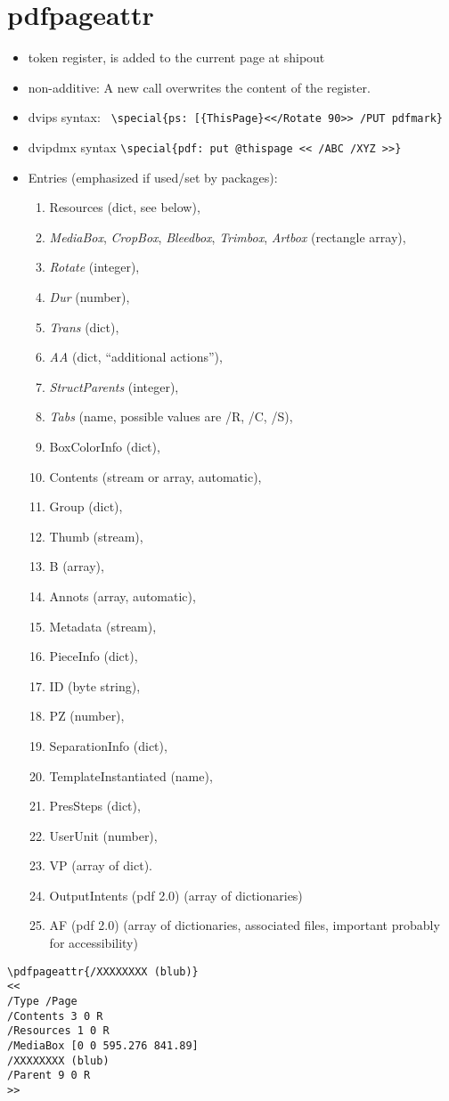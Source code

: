\documentclass{article}
\begin{document}
\section{pdfpageattr}
\begin{itemize}
\item token register, is added to the current page at shipout
\item non-additive: A new call overwrites the content of the register.
\item dvips syntax:
\verb+ \special{ps: [{ThisPage}<</Rotate 90>> /PUT pdfmark}+
\item dvipdmx syntax \verb+\special{pdf: put @thispage << /ABC /XYZ >>}+
\item Entries (emphasized if used/set by packages):
   \begin{enumerate}
    \item Resources (dict, see below),
    \item \emph{MediaBox}, \emph{CropBox}, \emph{Bleedbox}, \emph{Trimbox}, \emph{Artbox} (rectangle array),
    \item \emph{Rotate} (integer),
    \item \emph{Dur} (number),
    \item \emph{Trans} (dict),
    \item \emph{AA} (dict, \enquote{additional actions}),
    \item \emph{StructParents} (integer),
    \item \emph{Tabs} (name, possible values are /R, /C, /S),
    \item BoxColorInfo (dict),
    \item Contents (stream or array, automatic),
    \item Group (dict),
    \item Thumb (stream),
    \item B (array),
    \item Annots (array, automatic),
    \item Metadata (stream),
    \item PieceInfo (dict),
    \item ID (byte string),
    \item PZ (number),
    \item SeparationInfo (dict),
    \item TemplateInstantiated (name),
    \item PresSteps (dict),
    \item UserUnit (number),
    \item VP (array of dict).
    \item OutputIntents (pdf 2.0) (array of dictionaries)
    \item AF (pdf 2.0) (array of dictionaries, associated files, important probably for accessibility)
    \end{enumerate}
   \end{itemize}
\begin{verbatim}
\pdfpageattr{/XXXXXXXX (blub)}
<<
/Type /Page
/Contents 3 0 R
/Resources 1 0 R
/MediaBox [0 0 595.276 841.89]
/XXXXXXXX (blub)
/Parent 9 0 R
>>
\end{verbatim}
\end{document}
